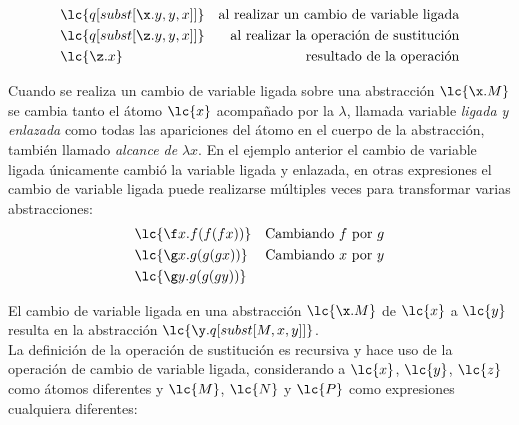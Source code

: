 \begin{align*}
  &\lc{q[subst[\x.y,y,x]]} &\text{al realizar un cambio de variable ligada} \\
  &\lc{q[subst[\z.y,y,x]]} &\text{al realizar la operación de sustitución} \\
  &\lc{\z.x}               &\text{resultado de la operación}
\end{align*}

Cuando se realiza un cambio de variable ligada sobre una abstracción
\(\lc{\x.M}\) se cambia tanto el átomo \(\lc{x}\) acompañado por la \(\lambda\),
llamada variable \emph{ligada y enlazada} como todas las apariciones del átomo
en el cuerpo de la abstracción, también llamado \emph{alcance de} \(\lambda x\).
En el ejemplo anterior el cambio de variable ligada únicamente cambió la
variable ligada y enlazada, en otras expresiones el cambio de variable ligada
puede realizarse múltiples veces para transformar varias abstracciones: \\

\begin{align*}
  &\lc{\f x.f(f(f x))} &\text{Cambiando \(f\) por \(g\)} \\
  &\lc{\g x.g(g(g x))} &\text{Cambiando \(x\) por \(y\)} \\
  &\lc{\g y.g(g(g y))} & \\
\end{align*}

El cambio de variable ligada en una abstracción \(\lc{\x.M}\) de \(\lc{x}\) a
\(\lc{y}\) resulta en la abstracción \(\lc{\y.q[subst[M,x,y]]}\). \\

La definición de la operación de sustitución es recursiva y hace uso de la
operación de cambio de variable ligada, considerando a \(\lc{x}\), \(\lc{y}\),
\(\lc{z}\) como átomos diferentes y \(\lc{M}\), \(\lc{N}\) y \(\lc{P}\) como
expresiones cualquiera diferentes:

